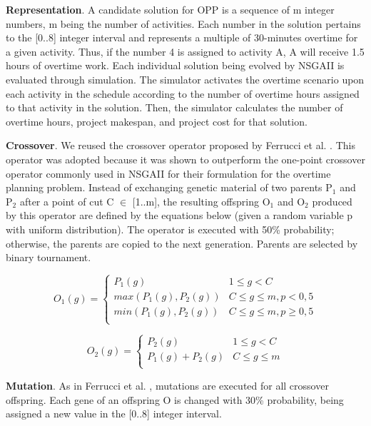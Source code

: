 \documentclass[conference]{IEEEtran}
\begin{document}
\textbf{Representation}. A candidate solution for OPP is a sequence of m integer numbers, m being the number of activities. Each number in the solution pertains to the [0..8] integer interval and represents a multiple of 30-minutes overtime for a given activity. Thus, if the number 4 is assigned to activity A, A will receive 1.5 hours of overtime work. Each individual solution being evolved by NSGAII is evaluated through simulation. The simulator activates the overtime scenario upon each activity in the schedule according to the number of overtime hours assigned to that activity in the solution. Then, the simulator calculates the number of overtime hours, project makespan, and project cost for that solution.

\textbf{Crossover}. We reused the crossover operator proposed by Ferrucci et al. \cite{Ferrucci:2013}. This operator was adopted because it was shown to outperform the one-point crossover operator commonly used in NSGAII for their formulation for the overtime planning problem. Instead of exchanging genetic material of two parents P$_{1}$ and P$_{2}$ after a point of cut C $\in$ [1..m], the resulting offspring O$_{1}$ and O$_{2}$ produced by this operator are defined by the equations below (given a random variable p with uniform distribution). The operator is executed with 50\% probability; otherwise, the parents are copied to the next generation. Parents are selected by binary tournament.
	
\begin{equation}
O_{1}(g)=
\left \{
\begin{array}{ll}
P_{1}(g) & 1\leq g < C \\
max(P_{1}(g), P_{2}(g)) & C\leq g\leq m,p < 0,5 \\
min(P_{1}(g), P_{2}(g)) & C\leq g\leq m,p \geq 0,5 \\
\end{array}
\right.
\end{equation}


\begin{equation}
O_{2}(g)=
\left \{
\begin{array}{ll}
P_{2}(g)& 1\leq g < C \\
P_{1}(g)+P_{2}(g) & C\leq g\leq m\\
\end{array}
\right.
\end{equation}

\textbf{Mutation}. As in Ferrucci et al. \cite{Ferrucci:2013}, mutations are executed for all crossover offspring. Each gene of an offspring O is changed with 30\% probability, being assigned a new value in the [0..8] integer interval.
\end{document}

